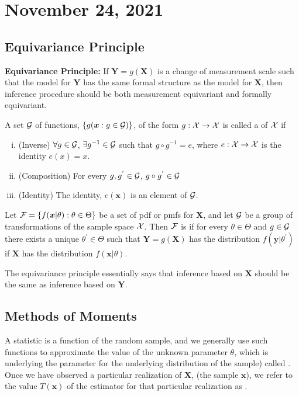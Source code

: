 \section{November 24, 2021}
\subsection{Equivariance Principle}
\textbf{Equivariance Principle:} If $\boldsymbol{Y} = g(\boldsymbol{X})$ is a change of measurement scale such that the model for $\boldsymbol{Y}$ has the same formal structure as the model for $\boldsymbol{X}$,  then inference procedure should be both measurement equivariant and formally equivariant. 
\begin{definition}
    A set $\mathcal G$ of functions, $\{ g(\boldsymbol{x}: g \in \mathcal G) \}$, of the form $g: \mathcal X \to \mathcal X$ is called a  of $\mathcal X$ if
    \begin{enumerate}[(i)]
        \item (Inverse) $\forall g \in \mathcal G$, $\exists g^{-1} \in \mathcal G$ such that $g\circ g^{-1} = e$, where $e: \mathcal X \to \mathcal X$ is the identity $e(x) = x$. 
        \item (Composition) For every $g,g^{'} \in \mathcal G$, $g \circ g^{'} \in \mathcal G$
        \item (Identity) The identity, $e(\boldsymbol{x})$ is an element of $\mathcal G$.
    \end{enumerate}
\end{definition}
\begin{definition}[Invariant]
    Let $\mathcal F = \{f(\boldsymbol{x}|\theta): \theta \in \Theta \}$ be a set of pdf or pmfs for $\boldsymbol{X}$, and let $\mathcal G$ be a group of transformations of the  sample space $\mathcal X$. Then $\mathcal F$ is  if for every $\theta \in \Theta$ and $g \in \mathcal G$ there exists a unique $\theta^{'} \in \Theta$ such that $\boldsymbol{Y} = g(\boldsymbol{X})$ has the distribution $f(\boldsymbol{y}|\theta^{'})$ if $\boldsymbol{X}$ has the distribution $f(\boldsymbol{x}|\theta)$.
\end{definition}
The equivariance principle essentially says that inference based on $\boldsymbol{X}$ should be the same as inference based on $\boldsymbol{Y}$.
\begin{example}

\end{example}
\begin{example}

\end{example}
\subsection{Methods of Moments}
A statistic is a function of the random sample, and we generally use such functions to approximate the value of the unknown parameter $\theta$, which is underlying the parameter for the underlying distribution of the sample) called . Once we have observed a particular realization of $\boldsymbol{X}$, (the sample $\boldsymbol{x}$), we refer to the value $T(\boldsymbol{x})$ of the estimator for that particular realization as .
